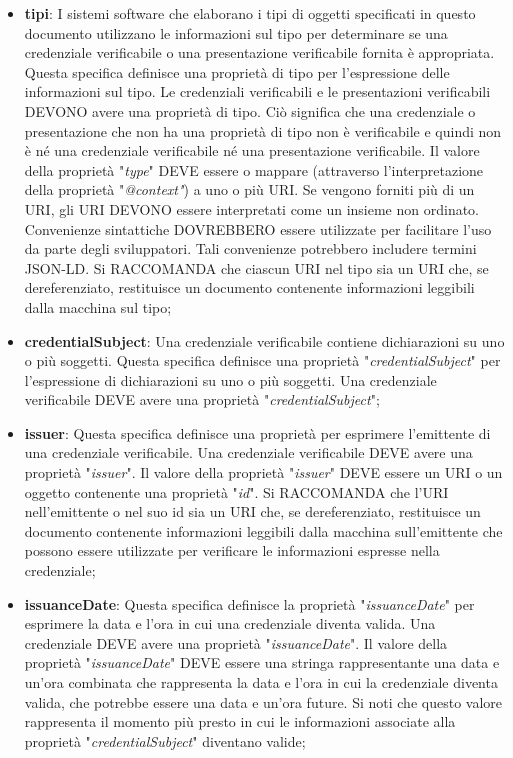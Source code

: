 \begin{itemize}
\item \textbf{tipi}: I sistemi software che elaborano i tipi di oggetti specificati in questo documento utilizzano le informazioni sul tipo per determinare se una credenziale verificabile o 
una presentazione verificabile fornita è appropriata. Questa specifica definisce una proprietà di tipo per l'espressione delle informazioni sul tipo.
Le credenziali verificabili e le presentazioni verificabili DEVONO avere una proprietà di tipo. Ciò significa che una credenziale o presentazione che non ha una proprietà di 
tipo non è verificabile e quindi non è né una credenziale verificabile né una presentazione verificabile.
Il valore della proprietà "\textit{type}" DEVE essere o mappare (attraverso l'interpretazione della proprietà "\textit{@context"}) a uno o più URI. Se vengono forniti più di un URI, gli URI DEVONO 
essere interpretati come un insieme non ordinato. Convenienze sintattiche DOVREBBERO essere utilizzate per facilitare l'uso da parte degli sviluppatori. Tali convenienze potrebbero 
includere termini JSON-LD. Si RACCOMANDA che ciascun URI nel tipo sia un URI che, se dereferenziato, restituisce un documento contenente informazioni leggibili dalla macchina sul tipo;

\item \textbf{credentialSubject}: Una credenziale verificabile contiene dichiarazioni su uno o più soggetti. Questa specifica definisce una proprietà "\textit{credentialSubject}" per 
l'espressione di dichiarazioni su uno o più soggetti.
Una credenziale verificabile DEVE avere una proprietà "\textit{credentialSubject}";

\item \textbf{issuer}: Questa specifica definisce una proprietà per esprimere l'emittente di una credenziale verificabile.
Una credenziale verificabile DEVE avere una proprietà "\textit{issuer}". Il valore della proprietà "\textit{issuer}" DEVE essere un URI o un oggetto contenente una proprietà "\textit{id}". Si RACCOMANDA 
che l'URI nell'emittente o nel suo id sia un URI che, se dereferenziato, restituisce un documento contenente informazioni leggibili dalla macchina sull'emittente che possono 
essere utilizzate per verificare le informazioni espresse nella credenziale;

\item \textbf{issuanceDate}: Questa specifica definisce la proprietà "\textit{issuanceDate}" per esprimere la data e l'ora in cui una credenziale diventa valida.
Una credenziale DEVE avere una proprietà "\textit{issuanceDate}". Il valore della proprietà "\textit{issuanceDate}" DEVE essere una stringa rappresentante una data e un'ora combinata che rappresenta la data e l'ora in cui la credenziale diventa valida, che potrebbe essere una data e un'ora future. Si noti che questo valore rappresenta il momento più presto 
in cui le informazioni associate alla proprietà "\textit{credentialSubject}" diventano valide;


\end{itemize}
